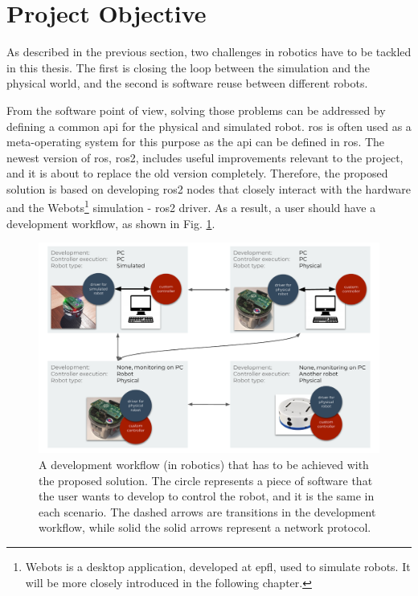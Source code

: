 \section{Project Objective}

As described in the previous section, two challenges in robotics have to be tackled in this thesis. The first is closing the loop between the simulation and the physical world, and the second is software reuse between different robots.

From the software point of view, solving those problems can be addressed by defining a common \ac{api} for the physical and simulated robot. \ac{ros} is often used as a meta-operating system for this purpose as the \ac{api} can be defined in \ac{ros}. The newest version of \ac{ros}, \ac{ros2}, includes useful improvements relevant to the project, and it is about to replace the old version completely. Therefore, the proposed solution is based on developing \ac{ros2} nodes that closely interact with the hardware and the Webots\footnote{Webots is a desktop application, developed at \ac{epfl}, used to simulate robots. It will be more closely introduced in the following chapter.} simulation - \ac{ros2} driver. As a result, a user should have a development workflow, as shown in Fig. \ref{fig:introduction:desired_workflow}.  

\begin{figure}[H]
    \centering
    \includegraphics[width=\textwidth]{introduction/figures/desired_workflow.pdf}
    \caption{A development workflow (in robotics) that has to be achieved with the proposed solution. The circle represents a piece of software that the user wants to develop to control the robot, and it is the same in each scenario. The dashed arrows are transitions in the development workflow, while solid the solid arrows represent a network protocol.}
    \label{fig:introduction:desired_workflow}
\end{figure}

